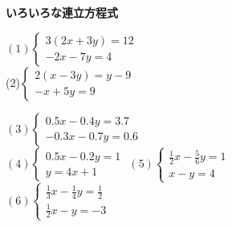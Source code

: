 \documentclass[b4paper,16.5pt,paparesize, landscape]{ltjsarticle}%
\begin{document}
{\textbf{\Large{いろいろな連立方程式}}}\hspace{\fill}{\scalebox{1.5}{（　）組（　　　　　　　　）}}\\
\begin{multicols*}{3}
$(1)\begin{cases}
	3(2x + 3y) = 12\\
	-2x - 7y = 4
\end{cases}$ 	\\[82mm]
(2)$\begin{cases}
	2(x-3y) = y-9\\
	-x + 5y = 9
\end{cases}$\vfill\null\columnbreak

$(3)\begin{cases}
	0.5x - 0.4y = 3.7\\
	-0.3x - 0.7y = 0.6
\end{cases}$ 	\\[82mm]
$(4)\begin{cases}
	0.5x - 0.2 y = 1\\
	y = 4x + 1
\end{cases}$
 \vfill\null\columnbreak
$(5)\begin{cases}
	\frac{1}{2}x - \frac{5}{6}y = 1\\
	x -y = 4
\end{cases}$ 	\\[82mm]
$(6)\begin{cases}
	\frac{1}{3}x - \frac{1}{4}y = \frac{1}{2}\\[10pt]
	\frac{1}{2}x - y = -3
\end{cases}$



\end{multicols*}
\end{document}
